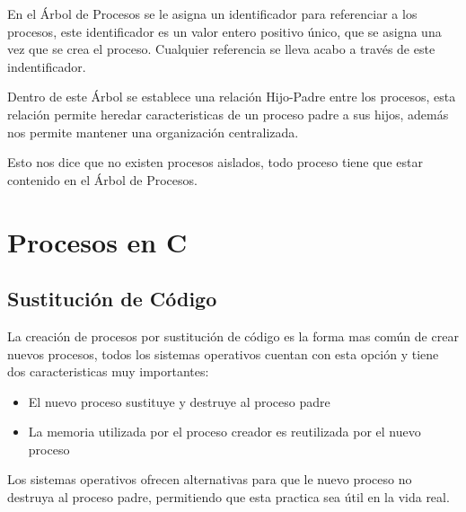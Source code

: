 \documentclass[12pt, fleqn]{report}                             %
\begin{document}
            En el Árbol de Procesos se le asigna un identificador para referenciar a los procesos, este
            identificador es un valor entero positivo único, que se asigna una vez que se crea el proceso.
            Cualquier referencia se lleva acabo a través de este indentificador.

            Dentro de este Árbol se establece una relación Hijo-Padre entre los procesos, esta relación 
            permite heredar caracteristicas de un proceso padre a sus hijos, además nos permite mantener
            una organización centralizada.

            Esto nos dice que no existen procesos aislados, todo proceso tiene que estar contenido en el
            Árbol de Procesos.



        \clearpage
        \section{Procesos en C}



            \subsection{Sustitución de Código}

                La creación de procesos por sustitución de código es la forma mas común de crear
                nuevos procesos, todos los sistemas operativos cuentan con esta opción y tiene 
                dos caracteristicas muy importantes:
                \begin{itemize}
                    \item El nuevo proceso sustituye y destruye al proceso padre
                    \item La memoria utilizada por el proceso creador es reutilizada por el nuevo
                    proceso
                \end{itemize}

                Los sistemas operativos ofrecen alternativas para que le nuevo proceso no destruya
                al proceso padre, permitiendo que esta practica sea útil en la vida real.
\end{document}
